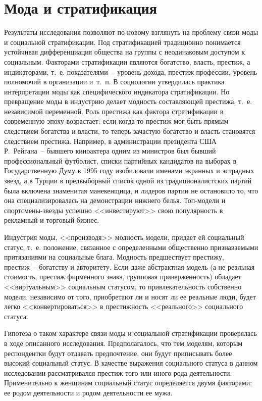   \section{Мода и стратификация}

  Результаты исследования позволяют по-новому взглянуть на проблему связи моды и
  социальной стратификации. Под стратификацией традиционно понимается устойчивая
  дифференциация общества на группы с неодинаковым доступом к социальным.
  Факторами стратификации являются богатство, власть, престиж, а индикаторами,
  т.~е. показателями~-- уровень дохода, престиж профессии, уровень полномочий в
  организации и~т.~п. В социологии утвердилась практика интерпретации моды как
  специфического индикатора стратификации. Но превращение моды в индустрию
  делает модность составляющей престижа, т.~е. независимой переменной. Роль
  престижа как фактора стратификации в современную эпоху возрастает: если
  когда-то престиж мог быть прямым следствием богатства и власти, то теперь
  зачастую богатство и власть становятся следствием престижа. Например, в
  администрации президента США Р.~Рейгана~-- бывшего киноактера одним из
  министров был бывший профессиональный футболист, списки партийных кандидатов
  на выборах в Государственную Думу в 1995 году изобиловали именами экранных и
  эстрадных звезд, а в Турции в предвыборный список одной из традиционалистских
  партий была включена знаменитая манекенщица, и лидеров партии не остановило
  то, что она специализировалась на демонстрации нижнего белья. Топ-модели и
  спортсмены-звезды успешно <<инвестируют>> свою популярность в рекламный и
  торговый бизнес.
  
  Индустрия моды, <<производя>> модность модели, придает ей социальный статус,
  т.~е. положение, связанное с определенными общественно признаваемыми
  притязаниями на социальные блага. Модность предшествует престижу, престиж~--
  богатству и авторитету. Если даже абстрактная модель (а не реальная стоимость,
  престиж фирменного знака, групповая приверженность) обладает <<виртуальным>>
  социальным статусом, то привлекательность собственно модели, независимо от
  того, приобретают ли и носят ли ее реальные люди, будет легко
  <<конвертироваться>> в престижность <<реального>> социального статуса.
  
  Гипотеза о таком характере связи моды и социальной стратификации проверялась в
  ходе описанного исследования. Предполагалось, что тем моделям, которым
  респондентки будут отдавать предпочтение, они будут приписывать более высокий
  социальный статус. В качестве выражения социального статуса в данном
  исследовании рассматривался престиж того или иного рода деятельности.
  Применительно к женщинам социальный статус определяется двумя факторами: ее
  родом деятельности и родом деятельности ее мужа.
  
